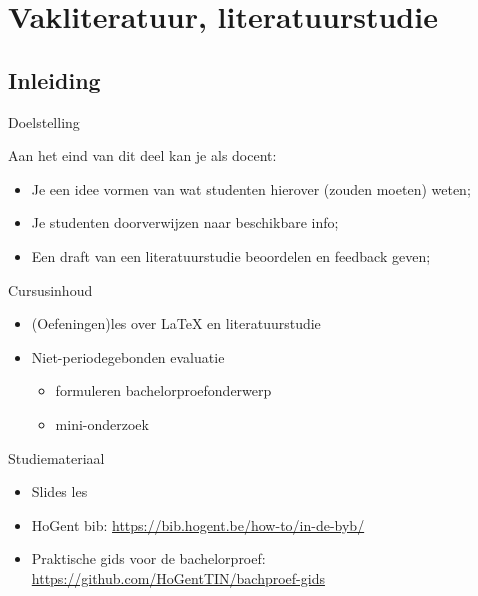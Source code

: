 \section{Vakliteratuur, literatuurstudie}


\subsection{Inleiding}
\begin{frame}{Doelstelling}
  
  Aan het eind van dit deel kan je als docent:
  
  \begin{itemize}
    \item Je een idee vormen van wat studenten hierover (zouden moeten) weten;
    \item Je studenten doorverwijzen naar beschikbare info;
    \item Een draft van een literatuurstudie beoordelen en feedback geven;
  \end{itemize}
\end{frame}

\begin{frame}{Cursusinhoud}
  \begin{itemize}
    \item (Oefeningen)les over \LaTeX{} en literatuurstudie
    \item Niet-periodegebonden evaluatie
      \begin{itemize}
        \item formuleren bachelorproefonderwerp
        \item mini-onderzoek
      \end{itemize}
  \end{itemize}
\end{frame}

\begin{frame}{Studiemateriaal}
  \begin{itemize}
    \item Slides les
    \item HoGent bib: \url{https://bib.hogent.be/how-to/in-de-byb/}
    \item Praktische gids voor de bachelorproef: \url{https://github.com/HoGentTIN/bachproef-gids}
  \end{itemize}
\end{frame}

